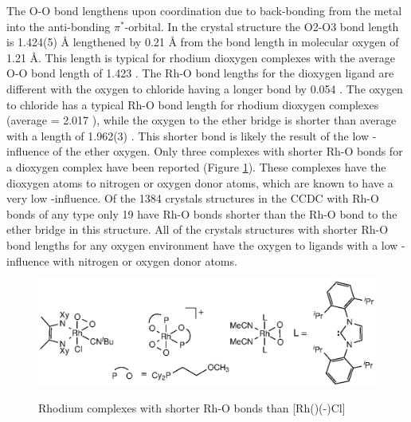 The O-O bond lengthens upon coordination due to back-bonding from the metal into the anti-bonding $\pi^*$-orbital.  In the crystal structure the O2-O3 bond length is 1.424(5) \si{\angstrom} lengthened by 0.21 \si{\angstrom} from the bond length in molecular oxygen of 1.21 \si{\angstrom}.  This length is typical for rhodium dioxygen complexes with the average O-O bond length of 1.423 \A.  
The Rh-O bond lengths for the dioxygen ligand are different with the oxygen \trans{} to chloride having a longer bond by 0.054 \A.  The oxygen \trans{} to chloride has a typical Rh-O bond length for rhodium dioxygen complexes (average = 2.017 \A), while the oxygen \trans{} to the ether bridge is shorter than average with a length of 1.962(3) \A.  This shorter bond is likely the result of the low \trans-influence of the ether oxygen.  Only three complexes with shorter Rh-O bonds for a dioxygen complex have been reported (Figure \ref{ShorterRhOcomplexes}).\cite{Lindner1993b, Penner2011, Wechsler2012} These complexes have the dioxygen atoms \trans{} to nitrogen or oxygen donor atoms, which are known to have a very low \trans-influence.  Of the 1384 crystals structures in the \gls{CCDC} with Rh-O bonds of any type only 19 have Rh-O bonds shorter than the Rh-O bond \trans{} to the ether bridge in this structure.  All of the crystals structures with shorter Rh-O bond lengths for any oxygen environment have the oxygen \trans{} to ligands with a low \trans-influence with nitrogen or oxygen donor atoms.

\begin{figure}[htp]
\begin{center}
\vspace{0.5cm}
\includegraphics{../Figures/OtherRhO2complexes.eps}
\caption[Rhodium complexes with shorter Rh-O bonds than \texorpdfstring{[Rh(\tBuxantphos)(-)Cl{]}} R]{Rhodium complexes with shorter Rh-O bonds than \texorpdfstring{[Rh(\tBuxantphos)(-)Cl{]}} R}
\vspace{0.2cm}
\label{ShorterRhOcomplexes}
\end{center}
\end{figure}
\vspace{0.2cm}

